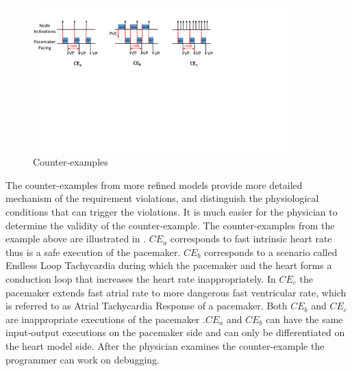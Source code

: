 \begin{figure}[!t]
		\centering
		\includegraphics[width=0.9\textwidth]{figs/case.pdf}
		\caption{\small Counter-examples}
		\label{fig:CE}
\end{figure}
The counter-examples from more refined models provide more detailed mechanism of the requirement violations, and distinguish the physiological conditions that can trigger the violations. It is much easier for the physician to determine the validity of the counter-example. The counter-examples from the example above are illustrated in . $CE_a$ corresponds to fast intrinsic heart rate thus is a safe execution of the pacemaker. $CE_b$ corresponds to a scenario called Endless Loop Tachycardia during which the pacemaker and the heart forms a conduction loop that increases the heart rate inappropriately. In $CE_c$ the pacemaker extends fast atrial rate to more dangerous fast ventricular rate, which is referred to as Atrial Tachycardia Response of a pacemaker. Both $CE_b$ and $CE_c$ are inappropriate executions of the pacemaker .$CE_a$ and $CE_b$ can have the same input-output executions on the pacemaker side and can only be differentiated on the heart model side. After the physician examines the counter-example the programmer can work on debugging.
%
 




